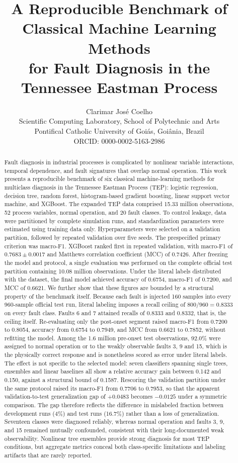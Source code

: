 \documentclass[10pt,twocolumn,a4paper]{article}
\title{\Large\textbf{A Reproducible Benchmark of Classical Machine Learning Methods\\
for Fault Diagnosis in the Tennessee Eastman Process}}
\author{Clarimar Jos\'e Coelho\\
\small Scientific Computing Laboratory, School of Polytechnic and Arts\\
\small Pontifical Catholic University of Goi\'as, Goi\^ania, Brazil\\
\small ORCID: 0000-0002-5163-2986}
\date{}
\begin{document}
\maketitle

\begin{abstract}
Fault diagnosis in industrial processes is complicated by nonlinear variable
interactions, temporal dependence, and fault signatures that overlap normal
operation. This work presents a reproducible benchmark of six classical
machine-learning methods for multiclass diagnosis in the Tennessee Eastman
Process (TEP): logistic regression, decision tree, random forest,
histogram-based gradient boosting, linear support vector machine, and XGBoost.
The expanded TEP data comprised 15.33 million observations, 52 process
variables, normal operation, and 20 fault classes. To control leakage, data
were partitioned by complete simulation runs, and standardization parameters
were estimated using training data only. Hyperparameters were selected on a
validation partition, followed by repeated validation over five seeds. The
prespecified primary criterion was macro-F1. XGBoost ranked first in repeated
validation, with macro-F1 of $0.7683\pm0.0017$ and Matthews correlation
coefficient (MCC) of $0.7426$. After freezing the model and protocol, a single
evaluation was performed on the complete official test partition containing
10.08 million observations. Under the literal labels distributed with the
dataset, the final model achieved accuracy of 0.6754, macro-F1 of 0.7200, and
MCC of 0.6621. We further show that these figures are bounded by a structural
property of the benchmark itself. Because each fault is injected 160 samples
into every 960-sample official test run, literal labeling imposes a recall
ceiling of $800/960=0.8333$ on every fault class. Faults 6 and 7 attained
recalls of 0.8333 and 0.8332, that is, the ceiling itself. Re-evaluating only
the post-onset segment raised macro-F1 from 0.7200 to 0.8054, accuracy from 0.6754 to
0.7949, and MCC from 0.6621 to 0.7852, without refitting the model. Among the
1.6 million pre-onset test observations, 92.0\% were assigned to normal
operation or to the weakly observable faults 3, 9 and 15, which is the
physically correct response and is nonetheless scored as error under literal
labels. The effect is not specific to the selected model: seven classifiers
spanning single trees, ensembles and linear baselines all show a relative
accuracy gain between 0.142 and 0.150, against a structural bound of 0.1587. Rescoring the validation partition under the same protocol raised its macro-F1
from 0.7706 to 0.7953, so that the apparent validation-to-test generalization
gap of $+0.0483$ becomes $-0.0125$ under a symmetric comparison. The gap
therefore reflects the difference in mislabeled fraction between development
runs (4\%) and test runs (16.7\%) rather than a loss of generalization. Seventeen classes were diagnosed reliably, whereas normal
operation and faults 3, 9, and 15 remained mutually confounded, consistent with
their long-documented weak observability. Nonlinear tree ensembles provide
strong diagnosis for most TEP conditions, but aggregate metrics conceal both
class-specific limitations and labeling artifacts that are rarely reported.
\end{abstract}
\end{document}
